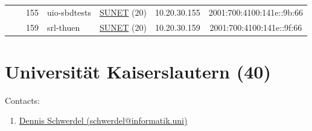\begin{small}
\begin{center}
\begin{longtable}{|c|c|c|c|c|c|c|c|}
  &  & \tiny{155} & \multicolumn{1}{|l|}{\tiny{uio-sbdtests}} & \multicolumn{2}{|c|}{\tiny{\href{http://www.sunet.se}{SUNET} (20)}} & \tiny{10.20.30.155} & \tiny{2001:700:4100:141e::9b:66} \\* \cline{3-3}\cline{4-4}\cline{5-5}\cline{6-6}\cline{7-7}\cline{8-8}
  &  & \tiny{159} & \multicolumn{1}{|l|}{\tiny{srl-thuen}} & \multicolumn{2}{|c|}{\tiny{\href{http://www.sunet.se}{SUNET} (20)}} & \tiny{10.20.30.159} & \tiny{2001:700:4100:141e::9f:66} \\ \hline
\end{longtable}
\end{center}
\end{small}



\section{Universität Kaiserslautern (40)}
\label{sec:TUKL}

Contacts:
\begin{enumerate}
 \item {}\href{mailto:schwerdel@informatik.uni}{Dennis Schwerdel (schwerdel@informatik.uni)}
\end{enumerate}

